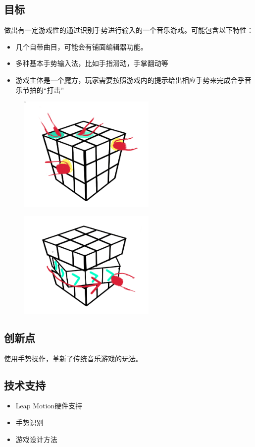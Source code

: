 \documentclass{article} \usepackage{CJK}
\begin{document}
\subsection{目标}
做出有一定游戏性的通过识别手势进行输入的一个音乐游戏。可能包含以下特性：
\begin{itemize}
  \item 几个自带曲目，可能会有铺面编辑器功能。
  \item 多种基本手势输入法，比如手指滑动，手掌翻动等
  \item 游戏主体是一个魔方，玩家需要按照游戏内的提示给出相应手势来完成合乎音乐节拍的“打击”
\end{itemize}
\begin{figure}[!h]
\begin{minipage}{0.5\linewidth}
  \includegraphics[width=18em]{pic1.png}\\
  \caption{}\label{1-1}
\end{minipage}
\begin{minipage}{0.5\linewidth}
  \includegraphics[width=18em]{pic2.png}\\
  \caption{}\label{1-2}
\end{minipage}
\end{figure}

\subsection{创新点}
使用手势操作，革新了传统音乐游戏的玩法。
\subsection{技术支持}
\begin{itemize}
  \item Leap Motion硬件支持
  \item 手势识别
  \item 游戏设计方法
\end{itemize}
\newpage
\end{document}
